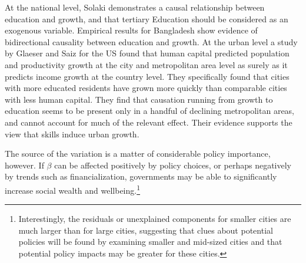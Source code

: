 % 



At the national level, Solaki \cite{solakiRelationshipEducationGDP2013} demonstrates a causal relationship between education and growth, and that tertiary Education should be considered as an exogenous variable.  Empirical results for Bangladesh \cite{islam2007relationship}show evidence of bidirectional causality between education and growth.  At the urban level a study by Glaeser and Saiz \cite{glaeserRiseSkilledCity2003} for the US found that human capital predicted population and productivity growth at the city and metropolitan area level as surely as it predicts income growth at the country level. They specifically found that cities with more educated residents have grown more quickly than comparable cities with less human capital. They find that causation running from growth to education seems to be present only in a handful of declining metropolitan areas, and cannot account for much of the relevant effect. Their evidence supports the view that skills induce urban growth.


The source of the variation is a matter of considerable policy importance, however. If $\beta$ can be affected positively by policy choices, or perhaps negatively by trends such as financialization, governments may be able to significantly increase social wealth and wellbeing.\footnote{Interestingly, the residuals or unexplained components for smaller cities are much larger than for large cities, suggesting that clues about potential policies will be found by examining smaller and mid-sized cities and that potential policy impacts may be greater for these cities.}

